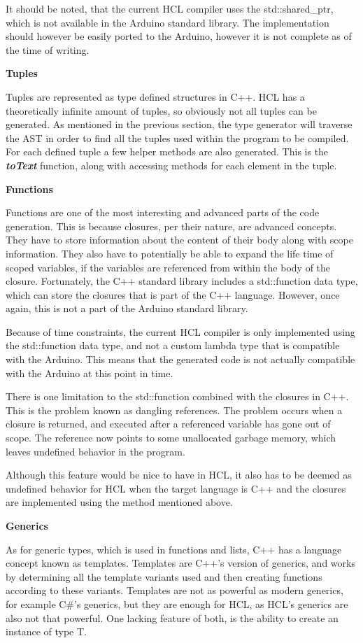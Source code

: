 It should be noted, that the current HCL compiler uses the std::shared\_ptr, which is not available in the Arduino standard library.
The implementation should however be easily ported to the Arduino, however it is not complete as of the time of writing.

\textbf{Tuples}

Tuples are represented as type defined structures in C++.
HCL has a theoretically infinite amount of tuples, so obviously not all tuples can be generated.
As mentioned in the previous section, the type generator will traverse the AST in order to find all the tuples used within the program to be compiled.
For each defined tuple a few helper methods are also generated.
This is the \textit{\textbf{toText}} function, along with accessing methods for each element in the tuple.

\textbf{Functions}

Functions are one of the most interesting and advanced parts of the code generation.
This is because closures, per their nature, are advanced concepts.
They have to store information about the content of their body along with scope information.
They also have to potentially be able to expand the life time of scoped variables, if the variables are referenced from within the body of the closure.
Fortunately, the C++ standard library includes a std::function data type, which can store the closures that is part of the C++ language.
However, once again, this is not a part of the Arduino standard library.

Because of time constraints, the current HCL compiler is only implemented using the std::function data type, and not a custom lambda type that is compatible with the Arduino.
This means that the generated code is not actually compatible with the Arduino at this point in time.

There is one limitation to the std::function combined with the closures in C++.
This is the problem known as dangling references.
The problem occurs when a closure is returned, and executed after a referenced variable has gone out of scope.
The reference now points to some unallocated garbage memory, which leaves undefined behavior in the program.

Although this feature would be nice to have in HCL, it also has to be deemed as undefined behavior for HCL when the target language is C++ and the closures are implemented using the method mentioned above.

\textbf{Generics}

As for generic types, which is used in functions and lists, C++ has a language concept known as templates.
Templates are C++'s version of generics, and works by determining all the template variants used and then creating functions according to these variants.
Templates are not as powerful as modern generics, for example C\#'s generics, but they are enough for HCL, as HCL's generics are also not that powerful.
One lacking feature of both, is the ability to create an instance of type T.

